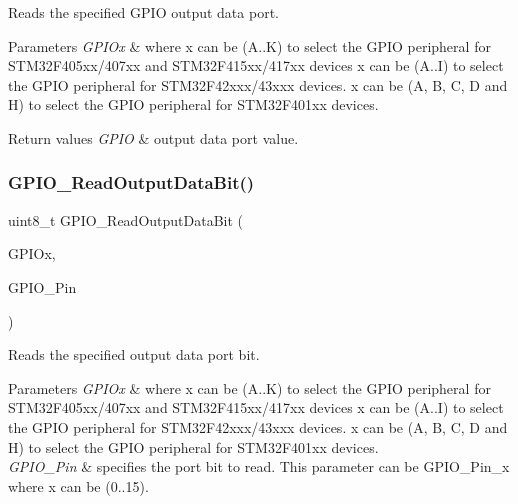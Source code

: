 Reads the specified G\+P\+IO output data port. 


\begin{DoxyParams}{Parameters}
{\em G\+P\+I\+Ox} & where x can be (A..K) to select the G\+P\+IO peripheral for S\+T\+M32\+F405xx/407xx and S\+T\+M32\+F415xx/417xx devices x can be (A..I) to select the G\+P\+IO peripheral for S\+T\+M32\+F42xxx/43xxx devices. x can be (A, B, C, D and H) to select the G\+P\+IO peripheral for S\+T\+M32\+F401xx devices. \\
\hline
\end{DoxyParams}

\begin{DoxyRetVals}{Return values}
{\em G\+P\+IO} & output data port value. \\
\hline
\end{DoxyRetVals}
\mbox{\label{group___g_p_i_o___group2_ga138270f8695b105b7c6ed405792919c1}} 
\subsubsection{\texorpdfstring{G\+P\+I\+O\+\_\+\+Read\+Output\+Data\+Bit()}{GPIO\_ReadOutputDataBit()}}
{\footnotesize\ttfamily uint8\+\_\+t G\+P\+I\+O\+\_\+\+Read\+Output\+Data\+Bit (\begin{DoxyParamCaption}\item[{G\+P\+I\+O\+\_\+\+Type\+Def $\ast$}]{G\+P\+I\+Ox,  }\item[{uint16\+\_\+t}]{G\+P\+I\+O\+\_\+\+Pin }\end{DoxyParamCaption})}



Reads the specified output data port bit. 


\begin{DoxyParams}{Parameters}
{\em G\+P\+I\+Ox} & where x can be (A..K) to select the G\+P\+IO peripheral for S\+T\+M32\+F405xx/407xx and S\+T\+M32\+F415xx/417xx devices x can be (A..I) to select the G\+P\+IO peripheral for S\+T\+M32\+F42xxx/43xxx devices. x can be (A, B, C, D and H) to select the G\+P\+IO peripheral for S\+T\+M32\+F401xx devices. \\
\hline
{\em G\+P\+I\+O\+\_\+\+Pin} & specifies the port bit to read. This parameter can be G\+P\+I\+O\+\_\+\+Pin\+\_\+x where x can be (0..15). \\
\hline
\end{DoxyParams}

